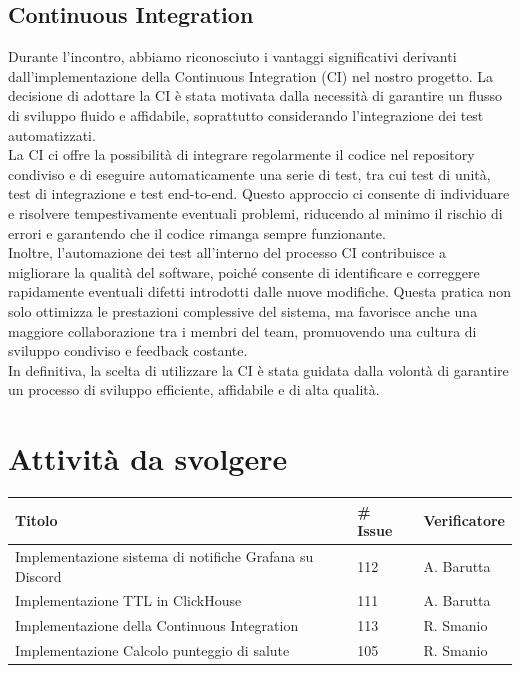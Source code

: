 \documentclass{article}
\begin{document}
    \subsection{Continuous Integration}
    Durante l'incontro, abbiamo riconosciuto i vantaggi significativi derivanti dall'implementazione della Continuous Integration (CI) nel nostro progetto. La decisione di adottare la CI è stata motivata dalla necessità di garantire un flusso di sviluppo fluido e affidabile, soprattutto considerando l'integrazione dei test automatizzati.\\
    La CI ci offre la possibilità di integrare regolarmente il codice nel repository condiviso e di eseguire automaticamente una serie di test, tra cui test di unità, test di integrazione e test end-to-end. Questo approccio ci consente di individuare e risolvere tempestivamente eventuali problemi, riducendo al minimo il rischio di errori e garantendo che il codice rimanga sempre funzionante.\\
    Inoltre, l'automazione dei test all'interno del processo CI contribuisce a migliorare la qualità del software, poiché consente di identificare e correggere rapidamente eventuali difetti introdotti dalle nuove modifiche. Questa pratica non solo ottimizza le prestazioni complessive del sistema, ma favorisce anche una maggiore collaborazione tra i membri del team, promuovendo una cultura di sviluppo condiviso e feedback costante.\\
    In definitiva, la scelta di utilizzare la CI è stata guidata dalla volontà di garantire un processo di sviluppo efficiente, affidabile e di alta qualità.

    \section{Attività da svolgere}
    \begin{center}
        \begin{tabular}{|C{7cm}|C{1,5cm}|C{3cm}|}
            \hline
            \textbf{Titolo} & \textbf{\# Issue} & \textbf{Verificatore} \\
            \hline
            \hline
            Implementazione sistema di notifiche Grafana su Discord & 112 & A. Barutta \\
            \hline
            Implementazione TTL in ClickHouse & 111 & A. Barutta \\
            \hline
            Implementazione della Continuous Integration & 113 & R. Smanio \\
            \hline
            Implementazione Calcolo punteggio di salute & 105 & R. Smanio\\
            \hline
        \end{tabular}
    \end{center}
\end{document}
